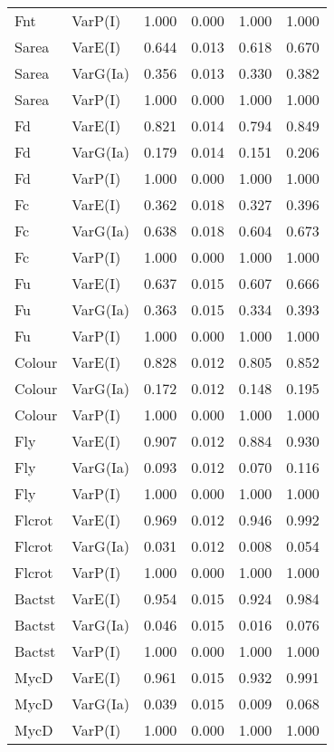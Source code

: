 \begin{center}
\begin{longtable}{|p{0.6in}|p{0.7in}|p{0.6in}|p{0.6in}|p{0.6in}|p{0.6in}|}
  Fnt & VarP(I) & 1.000 & 0.000 & 1.000 & 1.000 \\ 
  Sarea & VarE(I) & 0.644 & 0.013 & 0.618 & 0.670 \\ 
  Sarea & VarG(Ia) & 0.356 & 0.013 & 0.330 & 0.382 \\ 
  Sarea & VarP(I) & 1.000 & 0.000 & 1.000 & 1.000 \\ 
  Fd & VarE(I) & 0.821 & 0.014 & 0.794 & 0.849 \\ 
  Fd & VarG(Ia) & 0.179 & 0.014 & 0.151 & 0.206 \\ 
  Fd & VarP(I) & 1.000 & 0.000 & 1.000 & 1.000 \\ 
  Fc & VarE(I) & 0.362 & 0.018 & 0.327 & 0.396 \\ 
  Fc & VarG(Ia) & 0.638 & 0.018 & 0.604 & 0.673 \\ 
  Fc & VarP(I) & 1.000 & 0.000 & 1.000 & 1.000 \\ 
  Fu & VarE(I) & 0.637 & 0.015 & 0.607 & 0.666 \\ 
  Fu & VarG(Ia) & 0.363 & 0.015 & 0.334 & 0.393 \\ 
  Fu & VarP(I) & 1.000 & 0.000 & 1.000 & 1.000 \\ 
  Colour & VarE(I) & 0.828 & 0.012 & 0.805 & 0.852 \\ 
  Colour & VarG(Ia) & 0.172 & 0.012 & 0.148 & 0.195 \\ 
  Colour & VarP(I) & 1.000 & 0.000 & 1.000 & 1.000 \\ 
  Fly & VarE(I) & 0.907 & 0.012 & 0.884 & 0.930 \\ 
  Fly & VarG(Ia) & 0.093 & 0.012 & 0.070 & 0.116 \\ 
  Fly & VarP(I) & 1.000 & 0.000 & 1.000 & 1.000 \\ 
  Flcrot & VarE(I) & 0.969 & 0.012 & 0.946 & 0.992 \\ 
  Flcrot & VarG(Ia) & 0.031 & 0.012 & 0.008 & 0.054 \\ 
  Flcrot & VarP(I) & 1.000 & 0.000 & 1.000 & 1.000 \\ 
  Bactst & VarE(I) & 0.954 & 0.015 & 0.924 & 0.984 \\ 
  Bactst & VarG(Ia) & 0.046 & 0.015 & 0.016 & 0.076 \\ 
  Bactst & VarP(I) & 1.000 & 0.000 & 1.000 & 1.000 \\ 
  MycD & VarE(I) & 0.961 & 0.015 & 0.932 & 0.991 \\ 
  MycD & VarG(Ia) & 0.039 & 0.015 & 0.009 & 0.068 \\ 
  MycD & VarP(I) & 1.000 & 0.000 & 1.000 & 1.000 \\ 

\end{longtable}
\end{center}
